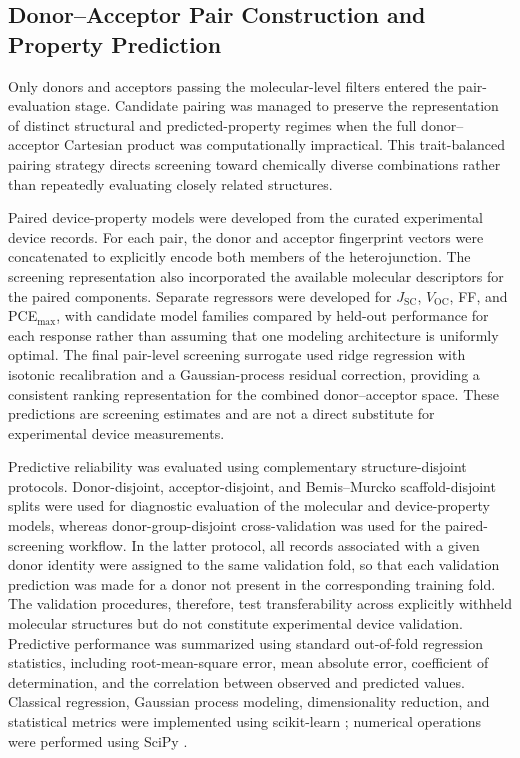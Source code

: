 \documentclass[12pt]{article}
\newcommand{\voc}{$V_\mathrm{OC}$}
\newcommand{\jsc}{$J_\mathrm{SC}$}
\newcommand{\pce}{PCE$_\mathrm{{max}}$}
\begin{document}
\subsection{Donor--Acceptor Pair Construction and Property Prediction}
Only donors and acceptors passing the molecular-level filters entered the pair-evaluation stage. Candidate pairing was managed to preserve the representation of distinct structural and predicted-property regimes when the full donor--acceptor Cartesian product was computationally impractical. This trait-balanced pairing strategy directs screening toward chemically diverse combinations rather than repeatedly evaluating closely related structures.

Paired device-property models were developed from the curated experimental device records. For each pair, the donor and acceptor fingerprint vectors were concatenated to explicitly encode both members of the heterojunction. The screening representation also incorporated the available molecular descriptors for the paired components. Separate regressors were developed for \jsc, \voc, FF, and \pce, with candidate model families compared by held-out performance for each response rather than assuming that one modeling architecture is uniformly optimal. The final pair-level screening surrogate used ridge regression with isotonic recalibration and a Gaussian-process residual correction, providing a consistent ranking representation for the combined donor--acceptor space. These predictions are screening estimates and are not a direct substitute for experimental device measurements.

Predictive reliability was evaluated using complementary structure-disjoint protocols. Donor-disjoint, acceptor-disjoint, and Bemis--Murcko scaffold-disjoint splits were used for diagnostic evaluation of the molecular and device-property models, whereas donor-group-disjoint cross-validation was used for the paired-screening workflow. In the latter protocol, all records associated with a given donor identity were assigned to the same validation fold, so that each validation prediction was made for a donor not present in the corresponding training fold. The validation procedures, therefore, test transferability across explicitly withheld molecular structures but do not constitute experimental device validation. Predictive performance was summarized using standard out-of-fold regression statistics, including root-mean-square error, mean absolute error, coefficient of determination, and the correlation between observed and predicted values. Classical regression, Gaussian process modeling, dimensionality reduction, and statistical metrics were implemented using scikit-learn \cite{pedregosa2011scikit}; numerical operations were performed using SciPy \cite{virtanen2020scipy}.
\end{document}
